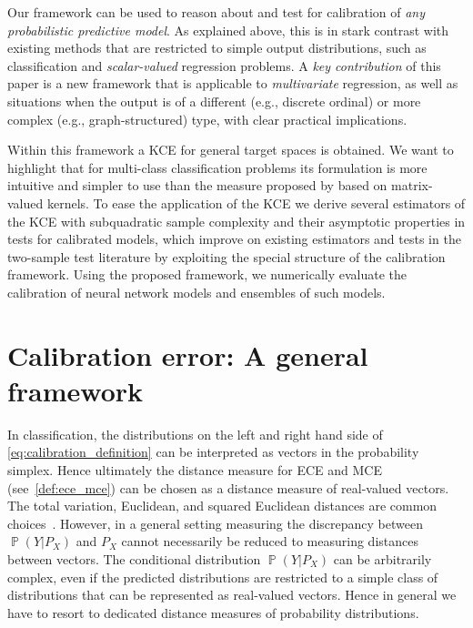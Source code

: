 \documentclass{article}
\DeclareMathOperator{\Prob}{\mathbb{P}}
\begin{document}
Our framework can be used to reason about and test for calibration of \emph{any
probabilistic predictive model}. As explained above, this is in stark contrast with
existing methods
that are restricted to simple output distributions, such as classification
and \emph{scalar-valued} regression problems. 
A \emph{key contribution} of this paper is a new framework that
is applicable to \emph{multivariate} regression, as well as situations when the output is of a
different (e.g., discrete ordinal) or more complex (e.g., graph-structured) type, with clear practical implications.

Within this framework a KCE for general target spaces is obtained. We want to highlight
that for multi-class classification problems its formulation is more intuitive and
simpler to use than the measure proposed by \citet{Widmann2019} based on matrix-valued
kernels.
To ease the application of the KCE we derive several
estimators of the KCE with subquadratic sample complexity and their asymptotic properties
in tests for calibrated models, which improve on existing estimators and tests in the
two-sample test literature by exploiting the special structure of the calibration
framework. Using the proposed framework, we numerically evaluate the calibration of neural
network models and ensembles of such models.

\section{Calibration error: A general framework}

In classification, the distributions on the left and right hand side of
\cref{eq:calibration_definition} can be interpreted as vectors in the probability
simplex. Hence ultimately the distance measure for ECE and MCE
(see~\cref{def:ece_mce}) can be chosen as a distance measure of real-valued vectors.
The total variation, Euclidean, and squared Euclidean distances
are common choices~\citep{Guo2017,Kull2019,Vaicenavicius2019}.
However, in a general setting measuring the discrepancy between
$\Prob(Y|P_X)$ and $P_X$ cannot necessarily be reduced to measuring
distances between vectors. The conditional distribution $\Prob(Y|P_X)$ can
be arbitrarily complex, even if the predicted distributions are restricted to a
simple class of distributions that can be represented as real-valued
vectors. Hence in general we have to resort to dedicated distance measures
of probability distributions.
\end{document}
